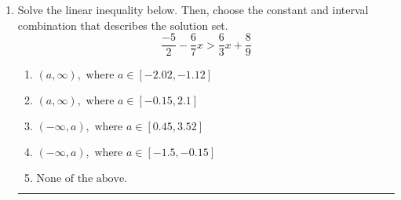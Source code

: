\documentclass[14pt]{extbook}
\newcommand{\litem}[1]{\item#1\hspace*{-1cm}\rule{\textwidth}{0.4pt}}
\begin{document}
\begin{enumerate}
{\begin{enumerate}[label=\Alph*.]
\end{enumerate} }
\litem{
Solve the linear inequality below. Then, choose the constant and interval combination that describes the solution set.\[ \frac{-5}{2} - \frac{6}{7} x > \frac{6}{3} x + \frac{8}{9} \]\begin{enumerate}[label=\Alph*.]
\item \( (a, \infty), \text{ where } a \in [-2.02, -1.12] \)
\item \( (a, \infty), \text{ where } a \in [-0.15, 2.1] \)
\item \( (-\infty, a), \text{ where } a \in [0.45, 3.52] \)
\item \( (-\infty, a), \text{ where } a \in [-1.5, -0.15] \)
\item \( \text{None of the above}. \)

\end{enumerate} }
\end{enumerate}
\end{document}

